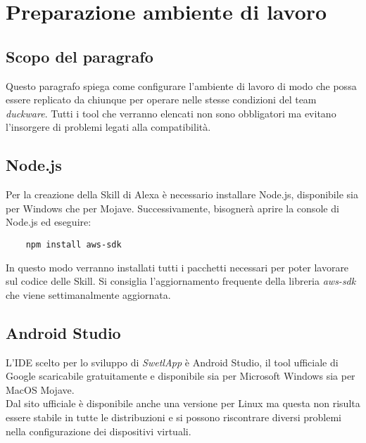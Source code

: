 \clearpage

\section{Preparazione ambiente di lavoro}
\label{sec:ambientelavoro}
\subsection{Scopo del paragrafo}
Questo paragrafo spiega come configurare l'ambiente di lavoro di modo che possa essere replicato da chiunque per operare nelle stesse condizioni del team \textit{duckware}. Tutti i tool che verranno elencati non sono obbligatori ma evitano l'insorgere di problemi legati alla compatibilità.

\subsection{Node.js}
Per la creazione della Skill di Alexa è necessario installare Node.js, disponibile sia per Windows che per Mojave. Successivamente, bisognerà aprire la console di Node.js ed eseguire:
\begin{verbatim}
    npm install aws-sdk
\end{verbatim}
In questo modo verranno installati tutti i pacchetti necessari per poter lavorare sul codice delle Skill. Si consiglia l'aggiornamento frequente della libreria \emph{aws-sdk} che viene settimanalmente aggiornata.

\subsection{Android Studio}
L'IDE scelto per lo sviluppo di \textit{SwetlApp} è Android Studio, il tool ufficiale di Google scaricabile gratuitamente e disponibile sia per Microsoft Windows sia per MacOS Mojave.\\[0.25cm]
Dal sito ufficiale è disponibile anche una versione per Linux ma questa non risulta essere stabile in tutte le distribuzioni e si possono riscontrare diversi problemi nella configurazione dei dispositivi virtuali.

